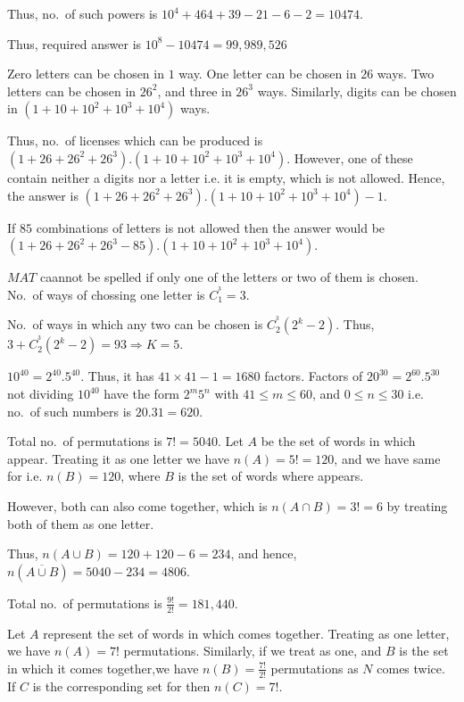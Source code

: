   Thus, no.\ of such powers is $10^4 + 464 + 39 − 21 − 6 − 2=10474$.

  Thus, required answer is $10^8 - 10474 = 99,989,526$
\item Zero letters can be chosen in $1$ way. One letter can be chosen in $26$ ways. Two letters can be
  chosen in $26^2$, and three in $26^3$ ways. Similarly, digits can be chosen in $(1 + 10 + 10^2 + 10^3 +
  10^4)$ ways.

  Thus, no.\ of licenses which can be produced is $(1 + 26 + 26^2 + 26^3).(1 + 10 + 10^2 + 10^3 +
  10^4)$. However, one of these contain neither a digits nor a letter i.e. it is empty, which is not
  allowed. Hence, the answer is $(1 + 26 + 26^2 + 26^3).(1 + 10 + 10^2 + 10^3 + 10^4) - 1$.

  If $85$ combinations of letters is not allowed then the answer would be $(1 + 26 + 26^2 + 26^3 - 85).(1 +
  10 + 10^2 + 10^3 + 10^4)$.
\item $MAT$ caannot be spelled if only one of the letters or two of them is chosen. No.\ of ways of chossing
  one letter is $C_1^^3 = 3$.

  No.\ of ways in which any two can be chosen is $C_2^^3(2^k - 2)$. Thus, $3 + C_2^^3(2^k - 2) = 93
  \Rightarrow K = 5$.
\item $10^{40} = 2^{40}.5^{40}$. Thus, it has $41\times41 - 1 = 1680$ factors. Factors of $20^{30} =
  2^{60}.5^{30}$ not dividing $10^{40}$ have the form $2^m5^n$ with $41\leq m\leq 60$, and $0\leq n\leq 30$
  i.e. no.\ of such numbers is $20.31 = 620$.
\item Total no.\ of permutations is $7! = 5040$. Let $A$ be the set of words in which 
  appear. Treating it as one letter we have $n(A) = 5! = 120$, and we have same for  i.e. $n(B)
  = 120$, where $B$ is the set of words where  appears.

  However, both can also come together, which is $n(A\cap B) = 3! = 6$ by treating both of them as one
  letter.

  Thus, $n(A\cup B) = 120 + 120  - 6 = 234$, and hence, $n(\overline{A\cup B}) = 5040 - 234 = 4806$.
\item Total no.\ of permutations is $\frac{9!}{2!} = 181,440$.

  Let $A$ represent the set of words in which  comes together. Treating  as one
  letter, we have $n(A) = 7!$ permutations. Similarly, if we  treat as one, and $B$ is the set
  in which it comes together,we have $n(B) = \frac{7!}{2!}$ permutations as $N$ comes twice. If $C$ is the
  corresponding set for  then $n(C) = 7!$.

